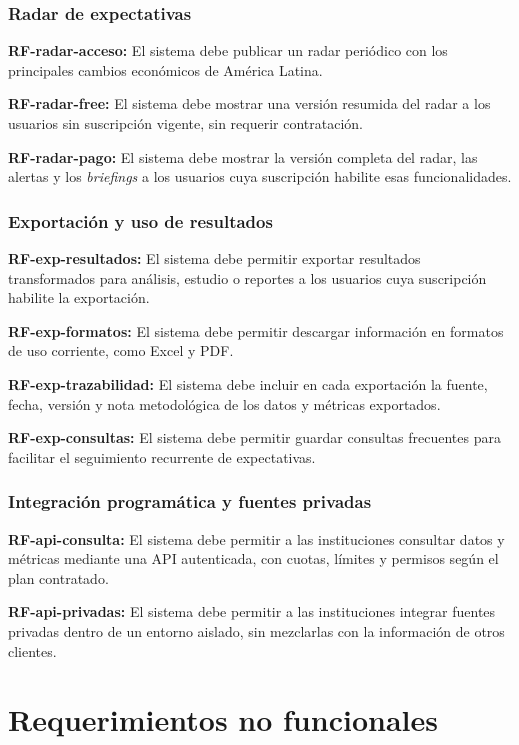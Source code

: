 \documentclass[11pt,a4paper]{article}
\newcommand{\rf}[2]{%
  \noindent
  \textbf{RF-#1:} #2
  \par\smallskip
}
\begin{document}
\subsubsection{Radar de expectativas}

\rf{radar-acceso}{El sistema debe publicar un radar peri\'odico con los
principales cambios econ\'omicos de Am\'erica Latina.}

\rf{radar-free}{El sistema debe mostrar una versi\'on resumida del radar a los
usuarios sin suscripci\'on vigente, sin requerir contrataci\'on.}

\rf{radar-pago}{El sistema debe mostrar la versi\'on completa del radar, las
alertas y los \emph{briefings} a los usuarios cuya suscripci\'on habilite esas
funcionalidades.}

\subsubsection{Exportación y uso de resultados}

\rf{exp-resultados}{El sistema debe permitir exportar resultados transformados
para an\'alisis, estudio o reportes a los usuarios cuya suscripci\'on habilite
la exportaci\'on.}

\rf{exp-formatos}{El sistema debe permitir descargar informaci\'on en formatos
de uso corriente, como Excel y PDF.}

\rf{exp-trazabilidad}{El sistema debe incluir en cada exportaci\'on la fuente,
fecha, versi\'on y nota metodol\'ogica de los datos y m\'etricas exportados.}

\rf{exp-consultas}{El sistema debe permitir guardar consultas frecuentes para
facilitar el seguimiento recurrente de expectativas.}

\subsubsection{Integración programática y fuentes privadas}

\rf{api-consulta}{El sistema debe permitir a las instituciones consultar datos y
m\'etricas mediante una API autenticada, con cuotas, l\'imites y permisos seg\'un
el plan contratado.}

\rf{api-privadas}{El sistema debe permitir a las instituciones integrar fuentes
privadas dentro de un entorno aislado, sin mezclarlas con la informaci\'on de
otros clientes.}

\section{Requerimientos no funcionales}
\label{sec:rnf}
\end{document}
